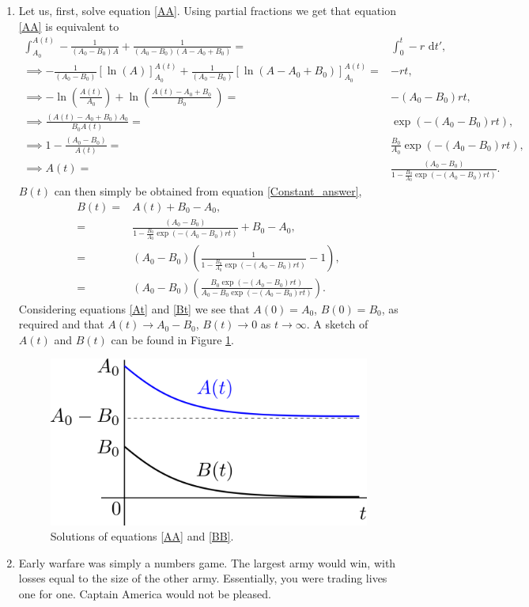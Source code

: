 \documentclass[10pt]{article}
\newcommand{\rd}{\text{ d}}
\newcommand{\fig}[1]{Figure \ref{#1}}
\newcommand{\eqn}[1]{equation \eqref{#1}}
\newcommand{\eqns}[2]{equations \eqref{#1} and \eqref{#2}}
\newcommand{\ttp}{.45\textwidth}
\renewcommand{\l}{\left(}
\renewcommand{\r}{\right)}
\begin{document}
\begin{Answ}
\begin{enumerate}
\item Let us, first,  solve \eqn{AA}. Using partial fractions we get that \eqn{AA} is equivalent to
\begin{align}
\int^{A(t)}_{A_0}-\frac{1}{\l A_0-B_0 \r A}+\frac{1}{
 \l A_0-B_0\r  \l A- A_0+B_0
 \r }=&\int^{t}_{0}-r\rd t',\\
 \implies -\frac{1}{\l A_0-B_0 \r}\left[\ln(A)\right]^{A(t)}_{A_0}+\frac{1}{\l A_0-B_0 \r}\left[\ln(A-A_0+B_0)\right]^{A(t)}_{A_0}=&-rt,\\
 \implies -\ln\l \frac{A(t)}{A_0}\r+\ln\l \frac{A(t)-A_0+B_0}{B_0}\ \r=&-(A_0-B_0)rt,\\
  \implies \frac{\l A(t)-A_0+B_0\r A_0}{B_0A(t)}=&\exp(-(A_0-B_0)rt),\\
    \implies 1-\frac{\l A_0-B_0\r }{A(t)}=&\frac{B_0}{A_0}\exp\l -(A_0-B_0)rt\r,\\
    \implies A(t)=&\frac{\l A_0-B_0\r }{1-\frac{B_0}{A_0}\exp\l -(A_0-B_0)rt\r}.\label{At}
\end{align}
$B(t)$ can then simply be obtained from \eqn{Constant_answer},
\begin{align}
B(t)=&A(t)+B_0-A_0,\\
=&\frac{\l A_0-B_0\r }{1-\frac{B_0}{A_0}\exp\l -(A_0-B_0)rt\r}+B_0-A_0,\\
=&(A_0-B_0)\l\frac{1}{1-\frac{B_0}{A_0}\exp\l -(A_0-B_0)rt\r}-1\r,\\
=&(A_0-B_0)\l \frac{ B_0 \exp\l -(A_0-B_0)rt\r }{ A_0-B_0 \exp\l -(A_0-B_0)rt\r }\r.\label{Bt}
\end{align}
Considering \eqns{At}{Bt} we see that $A(0)=A_0$, $B(0)=B_0$, as required and that $A(t)\rightarrow A_0-B_0$, $B(t)\rightarrow 0$ as $t\rightarrow \infty$. A sketch of $A(t)$ and $B(t)$ can be found in \fig{AB_sketch}.
\begin{figure}[h!!!tb]
\centering
\includegraphics[width=\ttp]{../../Pictures/AB_sketch.png}
\caption{\label{AB_sketch} Solutions of \eqns{AA}{BB}.}
\end{figure}
\item Early warfare was simply a numbers game. The largest army would win, with losses equal to the size of the other army. Essentially, you were trading lives one for one. Captain America would not be pleased.

\end{enumerate}
\end{Answ}
\end{document}
